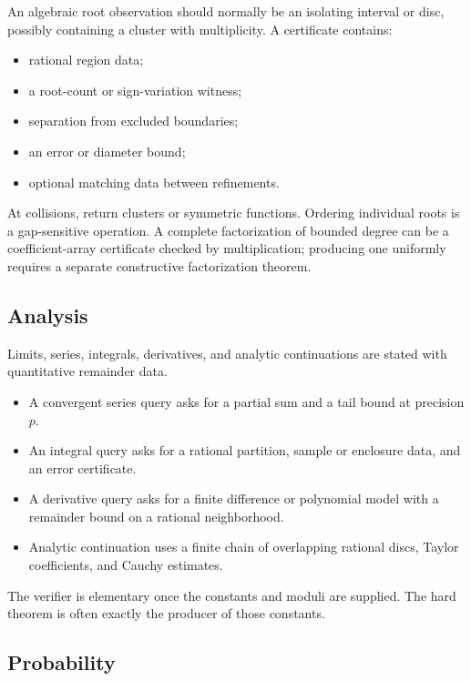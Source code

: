 An algebraic root observation should normally be an isolating interval or disc,
possibly containing a cluster with multiplicity.  A certificate contains:

\begin{itemize}
\item rational region data;
\item a root-count or sign-variation witness;
\item separation from excluded boundaries;
\item an error or diameter bound;
\item optional matching data between refinements.
\end{itemize}

At collisions, return clusters or symmetric functions.  Ordering individual
roots is a gap-sensitive operation.  A complete factorization of bounded degree
can be a coefficient-array certificate checked by multiplication; producing
one uniformly requires a separate constructive factorization theorem.

\subsection{Analysis}

Limits, series, integrals, derivatives, and analytic continuations are stated
with quantitative remainder data.

\begin{itemize}
\item A convergent series query asks for a partial sum and a tail bound at
precision \(p\).
\item An integral query asks for a rational partition, sample or enclosure data,
and an error certificate.
\item A derivative query asks for a finite difference or polynomial model with
a remainder bound on a rational neighborhood.
\item Analytic continuation uses a finite chain of overlapping rational discs,
Taylor coefficients, and Cauchy estimates.
\end{itemize}

The verifier is elementary once the constants and moduli are supplied.  The
hard theorem is often exactly the producer of those constants.

\subsection{Probability}

